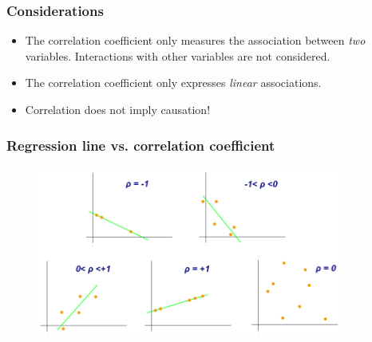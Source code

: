 \documentclass{beamer}
\begin{document}
\begin{frame}
  \frametitle{Considerations}
  
  \begin{itemize}
    \item The correlation coefficient only measures the association between \emph{two} variables. Interactions with other variables are not considered.
    \item The correlation coefficient only expresses \emph{linear} associations.
    \item Correlation does not imply causation!
  \end{itemize}
\end{frame}

\begin{frame}
  \frametitle{Regression line vs. correlation coefficient}

  \begin{figure}
    \centering
    \includegraphics[width=0.90\textwidth]{img/les3-regressie.png}
    \label{fig:les3-regressie}
  \end{figure}

\end{frame}

\end{document}
